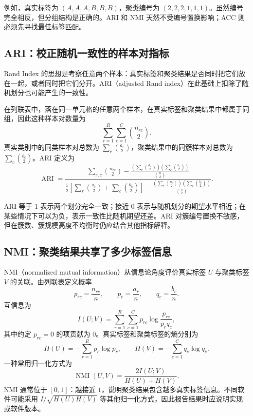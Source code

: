 \documentclass[UTF8,zihao=-4,openany]{ctexbook}
\begin{document}
例如，真实标签为 \((A,A,A,B,B,B)\)，聚类编号为 \((2,2,2,1,1,1)\)。虽然编号完全相反，但分组结构是正确的。ARI 和 NMI 天然不受编号置换影响；ACC 则必须先寻找最佳标签匹配。

\subsection{ARI：校正随机一致性的样本对指标}

Rand Index 的思想是考察任意两个样本：真实标签和聚类结果是否同时把它们放在一起，或者同时把它们分开。ARI（adjusted Rand index）在此基础上扣除了随机划分也可能产生的一致性。

在列联表中，落在同一单元格的任意两个样本，在真实标签和聚类结果中都属于同组，因此这种样本对数量为
\[
  \sum_{r=1}^{R}\sum_{c=1}^{C}\binom{n_{rc}}{2}.
\]
真实类别中的同类样本对总数为
\(
\sum_r\binom{a_r}{2}
\)，聚类结果中的同簇样本对总数为
\(
\sum_c\binom{b_c}{2}
\)。ARI 定义为
\begin{equation}
  \operatorname{ARI}
  =
  \frac{
    \displaystyle
    \sum_{r,c}\binom{n_{rc}}{2}
    -
    \frac{
      \displaystyle
      \left(\sum_r\binom{a_r}{2}\right)
      \left(\sum_c\binom{b_c}{2}\right)
    }{\binom{n}{2}}
  }{
    \displaystyle
    \frac{1}{2}
    \left[
      \sum_r\binom{a_r}{2}
      +
      \sum_c\binom{b_c}{2}
    \right]
    -
    \frac{
      \displaystyle
      \left(\sum_r\binom{a_r}{2}\right)
      \left(\sum_c\binom{b_c}{2}\right)
    }{\binom{n}{2}}
  }.
  \label{eq:ari}
\end{equation}

ARI 等于 \(1\) 表示两个划分完全一致；接近 \(0\) 表示与随机划分的期望水平相近；在某些情况下可以为负，表示一致性比随机期望还差。ARI 对簇编号置换不敏感，但在簇数、簇规模高度不均衡时仍应结合其他指标解释。

\subsection{NMI：聚类结果共享了多少标签信息}

NMI（normalized mutual information）从信息论角度评价真实标签 \(U\) 与聚类标签 \(V\) 的关联。由列联表定义概率
\[
  p_{rc}=\frac{n_{rc}}{n},
  \qquad
  p_r=\frac{a_r}{n},
  \qquad
  q_c=\frac{b_c}{n}.
\]
互信息为
\begin{equation}
  I(U;V)
  =
  \sum_{r=1}^{R}\sum_{c=1}^{C}
  p_{rc}
  \log\frac{p_{rc}}{p_rq_c},
  \label{eq:mutual-information}
\end{equation}
其中约定 \(p_{rc}=0\) 的项贡献为 \(0\)。真实标签和聚类标签的熵分别为
\[
  H(U)=-\sum_{r=1}^{R}p_r\log p_r,
  \qquad
  H(V)=-\sum_{c=1}^{C}q_c\log q_c.
\]
一种常用归一化方式为
\begin{equation}
  \operatorname{NMI}(U,V)
  =
  \frac{2I(U;V)}{H(U)+H(V)}.
  \label{eq:nmi}
\end{equation}
NMI 通常位于 \([0,1]\)：越接近 \(1\)，说明聚类结果包含越多真实标签信息。不同软件可能采用 \(I/\sqrt{H(U)H(V)}\) 等其他归一化方式，因此报告结果时应说明实现或软件版本。
\end{document}
